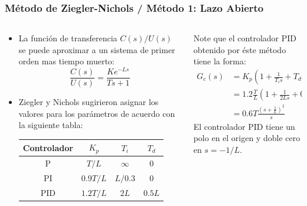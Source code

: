 \documentclass[aspectratio=169]{beamer}
\theoremstyle{definition}
\theoremstyle{plain}
\theoremstyle{remark}
\begin{document}
\begin{frame}[<+->]\frametitle{Método de Ziegler-Nichols / Método 1: Lazo Abierto}
\begin{columns}
\begin{column}{0.5\textwidth}
\small
\begin{itemize}
	\item La función de transferencia $C(s)/U(s)$ se puede aproximar a un sistema de primer orden mas tiempo muerto:
	\begin{equation*}
		\frac{C(s)}{U(s)} = \frac{K e^{-Ls}}{Ts + 1}
	\end{equation*}
	\item Ziegler y Nichols sugirieron asignar los valores para los parámetros de acuerdo con la siguiente tabla:
	\begin{table}
	\begin{tabular}{c|c|c|c}
		Controlador & $K_p$ & $T_i$ & $T_d$\\
		\hline
		P   & $T/L$ & $\infty$ & 0\\
		PI  & $0.9T/L$ & $L/0.3$ & 0\\
		PID & $1.2T/L$ & $2L$ & $0.5L$
	\end{tabular}
	\end{table}
\end{itemize}
\end{column}	
\begin{column}{0.5\textwidth}
Note que el controlador PID obtenido por éste método tiene la forma:
\begin{align*}
	G_c(s) &= K_p\left( 1 + \frac{1}{T_i s} + T_d s \right)\\
	&= 1.2\frac{T}{L}\left( 1 + \frac{1}{2Ls} + 0.5 Ls \right)\\
	&= 0.6T \frac{\left( s + \frac{1}{L} \right)^2}{s}
\end{align*}
El controlador PID tiene un polo en el origen y doble cero en $s = -1/L$.
\end{column}	
\end{columns}
\end{frame}
\end{document}
